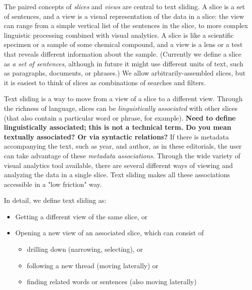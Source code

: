 \documentclass{sig-alternate}
\newcommand{\strong}[1] {\textbf{#1}}
\begin{document}
The paired concepts of \emph{slices} and \emph{views} are central to text sliding. A slice is a set of sentences, and a view is a visual representation of the data in a slice: the view can range from a simple vertical list of the sentences in the slice, to more complex linguistic processing combined with visual analytics.  A slice is like a scientific specimen or a sample of some chemical compound,  and a view is a lens or a test that reveals different information about the sample.
(Currently we define a slice as \emph{a set of sentences}, although in future it might use different units of text, such as paragraphs, documents, or phrases.) We allow arbitrarily-assembled slices, but it is easiest to think of slices as combinations of searches and filters.  


Text sliding is a way to move from a view of a slice to a different view. Through the richness of language, slices can be \emph{linguistically associated} with other slices (that also contain a particular word or phrase, for example). \strong{Need to define linguistically associated; this is not a technical term.  Do you mean textually associated?  Or via syntactic relations?} If there is metadata accompanying the text, such as year, and author, as in these editorials, the user can take advantage of these  \emph{metadata associations}.  Through the wide variety of visual analytics tool available, there are several different ways of viewing and analyzing the data in a single slice. Text sliding makes all these associations accessible in a "low friction" way.

In detail, we define text sliding as:
\begin{itemize}
	\item Getting a different view of the same slice, or
	\item Opening a new view of an associated slice, which can consist of
	\begin{itemize}
	  \item drilling down (narrowing, selecting), or
	  \item following a new thread (moving laterally) or
	  \item finding related words or sentences  (also moving laterally)
	 \end{itemize}
\end{itemize}
\end{document}
